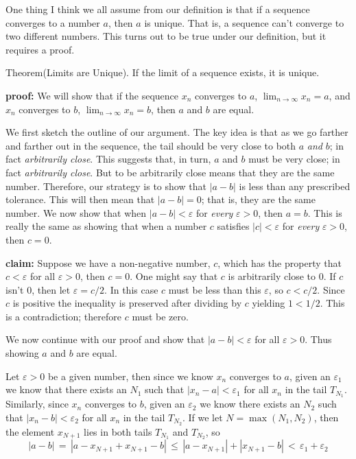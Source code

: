 One thing I think we all assume from our definition is that if a sequence
converges to a number $a$, then $a$ is unique. That is, a sequence can't
converge to two different numbers. This turns out to be true under our 
definition, but it requires a proof.

\proclaim Theorem(Limits are Unique). If the limit of a sequence exists, 
it is unique.

{\bf proof:\/} We will show that if the sequence $x_n$ converges to $a$, 
$\lim_{n \rightarrow \infty} x_n = a$, and $x_n$ converges to $b$, 
$\lim_{n \rightarrow \infty} x_n = b$, then $a$ and $b$ are equal.

We first sketch the outline of our argument. The key idea is that as we go 
farther and farther out in the sequence, the tail should be
very close to both $a$ {\it and\/} $b$; in fact {\it arbitrarily close\/}. 
This suggests that, in turn, 
$a$ and $b$ must be
very close; in fact {\it arbitrarily close\/}. But to be arbitrarily close 
means that 
they are the same number. Therefore, our strategy is to show that
$|a - b|$ is less than any prescribed tolerance. This will then mean
that $|a - b| = 0$; that is, they are the same number.
We now show that when $|a - b| < \varepsilon$ for {\it every\/}
$\varepsilon > 0$, then $a = b$. This is really the same as showing that when
a number $c$ satisfies $|c| < \varepsilon$ for {\it every\/}
$\varepsilon > 0$, then $c = 0$. 

{\bf claim:\/}
Suppose we have a non-negative number, $c$, which has the property that $c <
\varepsilon$ for all $\varepsilon > 0$, then $c = 0$. One might say that $c$ is 
arbitrarily close to $0$. If 
$c$ isn't 0, then let $\varepsilon = c/2$. In this case $c$ must be less than this $\varepsilon$, so
$c < c/2$. Since $c$ is positive the inequality is preserved after dividing by $c$ yielding
$1 < 1/2$. This is a contradiction; therefore $c$ must be zero. 

We now continue with our proof and show that $|a-b| < \varepsilon$ for all
$\varepsilon > 0$. Thus showing $a$ and $b$ are equal.

Let $\varepsilon>0$ be a given number, then since we know $x_n$ converges 
to $a$, given an $\varepsilon_1$ we know that there exists an $N_1$ such that 
$|x_n - a| < \varepsilon_1$ for all $x_n$ in
the tail $T_{N_1}$. Similarly, since $x_n$ converges to $b$, given
an $\varepsilon_2$
we know there exists an $N_2$
such that  $|x_n - b| < \varepsilon_2$ for all $x_n$ in
the tail $T_{N_2}$. If we let $N = \max(N_1,N_2)$, then the element
$x_{N+1}$ lies in both tails $T_{N_1}$ and $T_{N_2}$, so
$$
|a - b| \,= \,|a - x_{N+1} + x_{N+1} - b| \, \le \, |a - x_{N+1}| +
|x_{N+1} - b|  \, < \,
\varepsilon_1 + \varepsilon_2
$$

